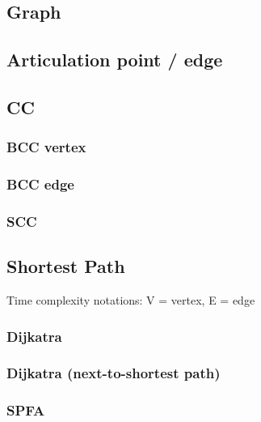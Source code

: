 \documentclass[10pt,oneside]{article}
\begin{document}
\begin{landscape}
\begin{multicols}{2}

\section{Graph}

\subsection{Articulation point / edge}

\subsection{CC}

\subsubsection{BCC vertex}

\subsubsection{BCC edge}

\subsubsection{SCC}

\subsection{Shortest Path}

Time complexity notations: V = vertex, E = edge

\subsubsection{Dijkatra}


\subsubsection{Dijkatra (next-to-shortest path)}


\subsubsection{SPFA}



\end{multicols}
\end{landscape}
\end{document}
